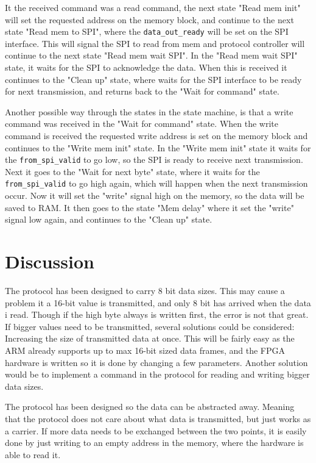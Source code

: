 It the received command was a read command, the next state "Read mem init" will set the requested address on the memory block, and continue to the next state "Read mem to SPI", where the \texttt{data\_out\_ready} will be set on the SPI interface. This will signal the SPI to read from mem and protocol controller will continue to the next state "Read mem wait SPI". In the "Read mem wait SPI" state, it waits for the SPI to acknowledge the data. When this is received it continues to the "Clean up" state, where waits for the SPI interface to be ready for next transmission, and returns back to the "Wait for command" state.

Another possible way through the states in the state machine, is that a write command was received in the "Wait for command" state. When the write command is received the requested write address is set on the memory block and continues to the "Write mem init" state. In the "Write mem init" state it waits for the \texttt{from\_spi\_valid} to go low, so the SPI is ready to receive next transmission. Next it goes to the "Wait for next byte" state, where it waits for the \texttt{from\_spi\_valid} to go high again, which will happen when the next transmission occur. Now it will set the "write" signal high on the memory, so the data will be saved to RAM. It then goes to the state "Mem delay" where it set the "write" signal low again, and continues to the "Clean up" state.


\section{Discussion}
The protocol has been designed to carry 8 bit data sizes. This may cause a problem it a 16-bit value is transmitted, and only 8 bit has arrived when the data i read. Though if the high byte always is written first, the error is not that great. If bigger values need to be transmitted, several solutions could be considered: Increasing the size of transmitted data at once. This will be fairly easy as the ARM already supports up to max 16-bit sized data frames, and the FPGA hardware is written so it is done by changing a few parameters. Another solution would be to implement a command in the protocol for reading and writing bigger data sizes.

The protocol has been designed so the data can be abstracted away. Meaning that the protocol does not care about what data is transmitted, but just works as a carrier. If more data needs to be exchanged between the two points, it is easily done by just writing to an empty address in the memory, where the hardware is able to read it.

